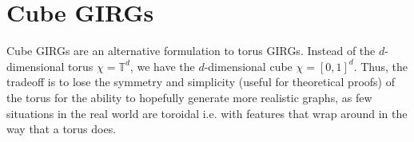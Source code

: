 




\section{Cube GIRGs}

Cube GIRGs are an alternative formulation to torus GIRGs. Instead of the $d$-dimensional torus $\chi = \mathbb{T}^d$, we have the $d$-dimensional cube $\chi = [0,1]^d$. Thus, the tradeoff is to lose the symmetry and simplicity (useful for theoretical proofs) of the torus for the ability to hopefully generate more realistic graphs, as few situations in the real world are toroidal i.e. with features that wrap around in the way that a torus does.


